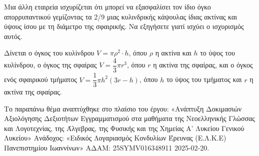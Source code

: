 \begin{center}
\end{center}
\begin{alist}[start=2]
\item Μια άλλη εταιρεία ισχυρίζεται ότι μπορεί να εξασφαλίσει τον ίδιο όγκο απορρυπαντικού γεμίζοντας τα 2/9 μιας κυλινδρικής κάψουλας ίδιας ακτίνας και ύψους ίσου με τη διάμετρο της σφαιρικής. Να εξηγήσετε γιατί ισχύει ο ισχυρισμός αυτός.

Δίνεται ο όγκος του κυλίνδρου $V = \pi\rho^{2} \cdot h$, όπου $\rho$ η ακτίνα και $h$ το ύψος του κυλίνδρου, ο όγκος της σφαίρας $V = \dfrac{4}{3}\pi r^{3}$, όπου $r$ η ακτίνα της σφαίρας, και ο όγκος ενός σφαιρικού τμήματος $V = \dfrac{1}{3}\pi h^{2}(3r - h)$, όπου $h$ το ύψος του τμήματος και $r$ η ακτίνα της σφαίρας.

{\footnotesize Το παραπάνω θέμα αναπτύχθηκε στο πλαίσιο του έργου: «Ανάπτυξη Δοκιμασιών Αξιολόγησης Δεξιοτήτων Εγγραμματισμού στα μαθήματα της Νεοελληνικής Γλώσσας και Λογοτεχνίας, της Άλγεβρας, της Φυσικής και της Χημείας Α' Λυκείου Γενικού Λυκείου» Ανάδοχος: «Ειδικός Λογαριασμός Κονδυλίων Έρευνας (Ε.Λ.Κ.Ε) Πανεπιστημίου Ιωαννίνων» ΑΔΑΜ: 25SYMV016348911 2025-02-20.}
\end{alist}

